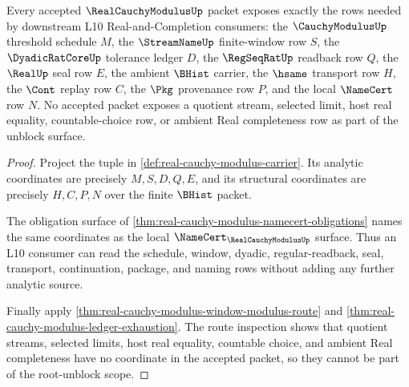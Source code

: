 \begin{theorem}
\label{thm:real-cauchy-modulus-root-unblock-scope}
Every accepted $\RealCauchyModulusUp$ packet exposes exactly the rows needed by downstream L10 Real-and-Completion consumers: the $\CauchyModulusUp$ threshold schedule $M$, the $\StreamNameUp$ finite-window row $S$, the $\DyadicRatCoreUp$ tolerance ledger $D$, the $\RegSeqRatUp$ readback row $Q$, the $\RealUp$ seal row $E$, the ambient $\BHist$ carrier, the $\hsame$ transport row $H$, the $\Cont$ replay row $C$, the $\Pkg$ provenance row $P$, and the local $\NameCert$ row $N$. No accepted packet exposes a quotient stream, selected limit, host real equality, countable-choice row, or ambient Real completeness row as part of the unblock surface.
\end{theorem}
\begin{proof}
Project the tuple in \autoref{def:real-cauchy-modulus-carrier}. Its analytic coordinates are precisely $M,S,D,Q,E$, and its structural coordinates are precisely $H,C,P,N$ over the finite $\BHist$ packet.

The obligation surface of \autoref{thm:real-cauchy-modulus-namecert-obligations} names the same coordinates as the local $\NameCert_{\RealCauchyModulusUp}$ surface. Thus an L10 consumer can read the schedule, window, dyadic, regular-readback, seal, transport, continuation, package, and naming rows without adding any further analytic source.

Finally apply \autoref{thm:real-cauchy-modulus-window-modulus-route} and \autoref{thm:real-cauchy-modulus-ledger-exhaustion}. The route inspection shows that quotient streams, selected limits, host real equality, countable choice, and ambient Real completeness have no coordinate in the accepted packet, so they cannot be part of the root-unblock scope.
\end{proof}


